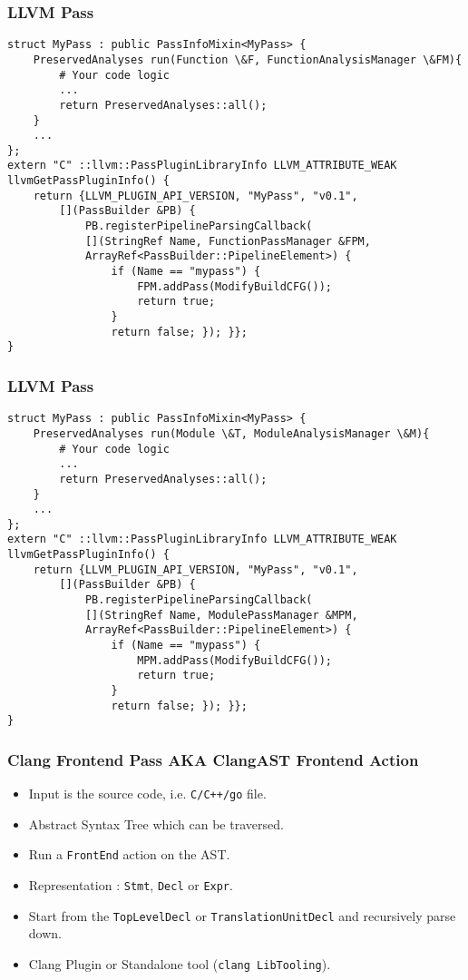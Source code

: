\documentclass{beamer}
\begin{document}
\begin{frame}[fragile]
	\frametitle{LLVM Pass}
	\begin{verbatim}
struct MyPass : public PassInfoMixin<MyPass> {
	PreservedAnalyses run(Function \&F, FunctionAnalysisManager \&FM){
		# Your code logic	
		...
		return PreservedAnalyses::all();
	}
	...
};
extern "C" ::llvm::PassPluginLibraryInfo LLVM_ATTRIBUTE_WEAK
llvmGetPassPluginInfo() {
	return {LLVM_PLUGIN_API_VERSION, "MyPass", "v0.1",
		[](PassBuilder &PB) {
			PB.registerPipelineParsingCallback(
			[](StringRef Name, FunctionPassManager &FPM,
			ArrayRef<PassBuilder::PipelineElement>) {
				if (Name == "mypass") {
					FPM.addPass(ModifyBuildCFG());
					return true;
				}
				return false; }); }};
}
	\end{verbatim}
\end{frame}

\begin{frame}[fragile]
	\frametitle{LLVM Pass}
	\begin{verbatim}
struct MyPass : public PassInfoMixin<MyPass> {
	PreservedAnalyses run(Module \&T, ModuleAnalysisManager \&M){
		# Your code logic	
		...
		return PreservedAnalyses::all();
	}
	...
};
extern "C" ::llvm::PassPluginLibraryInfo LLVM_ATTRIBUTE_WEAK
llvmGetPassPluginInfo() {
	return {LLVM_PLUGIN_API_VERSION, "MyPass", "v0.1",
		[](PassBuilder &PB) {
			PB.registerPipelineParsingCallback(
			[](StringRef Name, ModulePassManager &MPM,
			ArrayRef<PassBuilder::PipelineElement>) {
				if (Name == "mypass") {
					MPM.addPass(ModifyBuildCFG());
					return true;
				}
				return false; }); }};
}
	\end{verbatim}
\end{frame}

\begin{frame}
	\frametitle{Clang Frontend Pass AKA ClangAST Frontend Action}
	\begin{itemize}
		\item Input is the source code, i.e. \texttt{C/C++/go} file. \pause
		\item Abstract Syntax Tree which can be traversed. \pause
		\item Run a \texttt{FrontEnd} action on the AST. \pause
		\item Representation : \texttt{Stmt}, \pause \texttt{Decl} \pause or \texttt{Expr}. \pause
		\item Start from the \texttt{TopLevelDecl} or \texttt{TranslationUnitDecl} \pause and recursively parse down. \pause
		\item Clang Plugin or Standalone tool (\texttt{clang LibTooling}).
	\end{itemize}
\end{frame}
\end{document}
